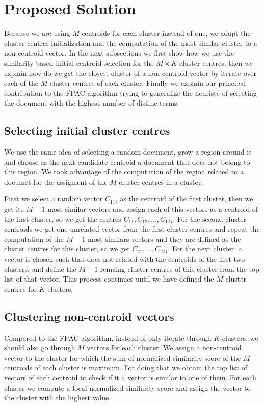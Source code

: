 \documentclass[runningheads]{llncs}
\begin{document}
\section{Proposed Solution}

Because we are using $M$ centroids for each cluster instead of one,
we adapt the cluster centres initialization and the computation
of the most similar cluster to a non-centroid vector.
In the next subsections we first show how we use the similarity-based
initial centroid selection for the $M \times K$ cluster centres,
then we explain how do we get the closest cluster of a non-centroid
vector by iterate over each of the $M$ cluster centres of each cluster.
Finally we explain our principal contribution to the FPAC algorithm
trying to generalize the heuristc of selecting the document
with the highest number of distinc terms.


\subsection{Selecting initial cluster centres}

We use the same idea of selecting a random document, grow a region around it and choose as the next candidate centroid a document that does not belong to this region. We took advantage of the computation of the region related to a documet for the assigment of the $M$ cluster centres in a cluster.

First we select a random vector $C_{11}$, as the centroid of the first cluster, then we get its $M - 1$ most similar vectors and assign each of
this vectors as a centroid of the first cluster, so we get the centres 
$C_{11}, C_{12},  \dots, C_{1M}$. For the second cluster centroids
we get one unrelated vector from the first cluster centres and 
repeat the computation of the $M-1$ most similars vectors and they are defined as the cluster centres for this cluster, so we get $C_{21}, \dots, C_{2M}$.
For the next cluster, a vector is chosen such that does not related with the centroids of the first two clusters, and define the $M-1$ remaing cluster centres of this cluster from the top list of that vector. This process continues until we have defined the $M$ cluster centres for $K$ clusters.

\subsection{Clustering non-centroid vectors}

Compared to the FPAC algorithm, instead of only iterate through
$K$ clusters, we should also go through $M$ vectors for each cluster.
We assign a non-centroid vector to the cluster for which the sum of 
normalized similarity score of the $M$ centroids of each cluster is maximum.
For doing that we obtain the top list of vectors of each centroid to check if it a vector is similar to one of them. For each cluster we compute a local normalized similarity score and assign the vector to the cluster with the highest value.
\end{document}
